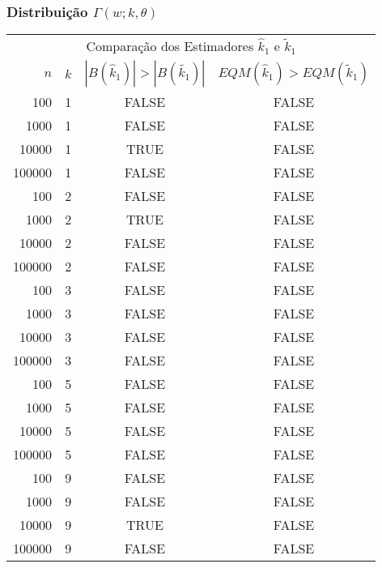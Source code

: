 \begin{frame}
  \frametitle{Distribuição $\Gamma(w;k,\theta)$}
  \tiny
  \begin{table}[h]
    \label{tab:gamma_r_m1}
    \centering
    \begin{tabular}{rccc}
      \toprule
      \multicolumn{4}{c}{Comparação dos Estimadores $\hat{k}_1$ e $\tilde{k}_1$}\\
      $n$ & $k$ & $|B(\hat{k}_1)|>|B(\tilde{k_1})|$ & $EQM(\hat{k}_1)>EQM(\tilde{k}_1)$ \\
      \midrule
      100 & 1 & FALSE & FALSE\\
      1000 & 1 & FALSE & FALSE\\
      10000 & 1 & TRUE & FALSE\\
      100000 & 1 & FALSE & FALSE\\
      100 & 2 & FALSE & FALSE\\
      1000 & 2 & TRUE & FALSE\\
      10000 & 2 & FALSE & FALSE\\
      100000 & 2 & FALSE & FALSE\\
      100 & 3 & FALSE & FALSE\\
      1000 & 3 & FALSE & FALSE\\
      10000 & 3 & FALSE & FALSE\\
      100000 & 3 & FALSE & FALSE\\
      100 & 5 & FALSE & FALSE\\
      1000 & 5 & FALSE & FALSE\\
      10000 & 5 & FALSE & FALSE\\
      100000 & 5 & FALSE & FALSE\\
      100 & 9 & FALSE & FALSE\\
      1000 & 9 & FALSE & FALSE\\
      10000 & 9 & TRUE & FALSE\\
      100000 & 9 & FALSE & FALSE\\
      \bottomrule
    \end{tabular}
  \end{table}
\end{frame}

